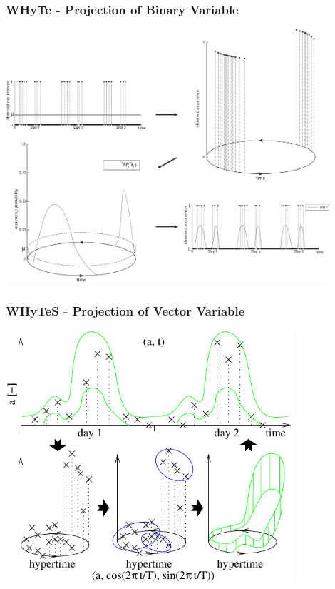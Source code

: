 
\begin{frame}
	\frametitle{WHyTe - Projection of Binary Variable}
    \vspace{3mm}
            \includegraphics[width=0.9\textwidth]{fig/hypertime_graphs_a.pdf}
\end{frame}



\begin{frame}
	\frametitle{WHyTeS - Projection of Vector Variable}
    \vspace{3mm}
            \includegraphics[width=0.8\textwidth]{fig/hypertime_space.pdf}
\end{frame}


